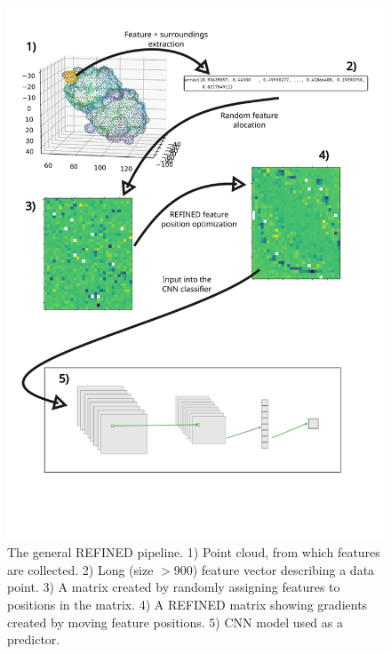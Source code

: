 \begin{figure}
    \centering
    \includegraphics[width=1\linewidth]{whole_pipeline_visualization.png}
    \caption{The general REFINED pipeline. 1) Point cloud, from which features are collected. 2) Long (size $> 900$) feature vector describing a data point. 3) A matrix created by randomly assigning features to positions in the matrix. 4) A REFINED matrix showing gradients created by moving feature positions. 5) CNN model used as a predictor.}
    \label{fig:whole-visualisation}
\end{figure}
